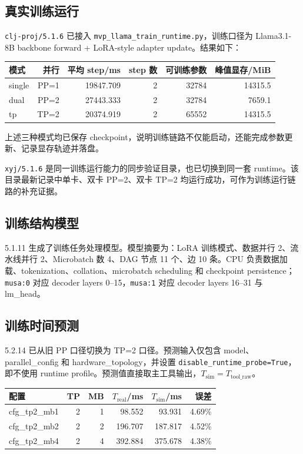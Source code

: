 \documentclass[UTF8,a4paper,11pt]{ctexart}
\begin{document}
\subsection{真实训练运行}

\texttt{clj-proj/5.1.6} 已接入 \texttt{mvp\_llama\_train\_runtime.py}，训练口径为 Llama3.1-8B backbone forward + LoRA-style adapter update。结果如下：

\begin{center}
\begin{tabular}{lrrrrr}
\toprule
\textbf{模式} & \textbf{并行} & \textbf{平均 step/ms} & \textbf{step 数} & \textbf{可训练参数} & \textbf{峰值显存/MiB} \\
\midrule
single & PP=1 & 19847.709 & 2 & 32784 & 14315.5 \\
dual & PP=2 & 27443.333 & 2 & 32784 & 7659.1 \\
tp & TP=2 & 20374.919 & 2 & 65552 & 14315.5 \\
\bottomrule
\end{tabular}
\end{center}

上述三种模式均已保存 checkpoint，说明训练链路不仅能启动，还能完成参数更新、记录显存轨迹并落盘。

\texttt{xyj/5.1.6} 是同一训练运行能力的同步验证目录，也已切换到同一套 runtime。该目录最新记录中单卡、双卡 PP=2、双卡 TP=2 均运行成功，可作为训练运行链路的补充证据。

\subsection{训练结构模型}

5.1.11 生成了训练任务处理模型。模型摘要为：LoRA 训练模式、数据并行 2、流水线并行 2、Microbatch 数 4、DAG 节点 11 个、边 10 条。CPU 负责数据加载、tokenization、collation、microbatch scheduling 和 checkpoint persistence；\texttt{musa:0} 对应 decoder layers 0--15，\texttt{musa:1} 对应 decoder layers 16--31 与 lm\_head。

\subsection{训练时间预测}

5.2.14 已从旧 PP 口径切换为 TP=2 口径。预测输入仅包含 model、parallel\_config 和 hardware\_topology，并设置 \texttt{disable\_runtime\_probe=True}，即不使用 runtime profile。预测值直接取主工具输出，$T_{\mathrm{sim}}=T_{\mathrm{tool\_raw}}$。

\begin{center}
\begin{tabular}{lrrrrr}
\toprule
\textbf{配置} & \textbf{TP} & \textbf{MB} & \textbf{$T_{\mathrm{real}}$/ms} & \textbf{$T_{\mathrm{sim}}$/ms} & \textbf{误差} \\
\midrule
cfg\_tp2\_mb1 & 2 & 1 & 98.552 & 93.931 & 4.69\% \\
cfg\_tp2\_mb2 & 2 & 2 & 196.707 & 187.817 & 4.52\% \\
cfg\_tp2\_mb4 & 2 & 4 & 392.884 & 375.678 & 4.38\% \\
\bottomrule
\end{tabular}
\end{center}
\end{document}
